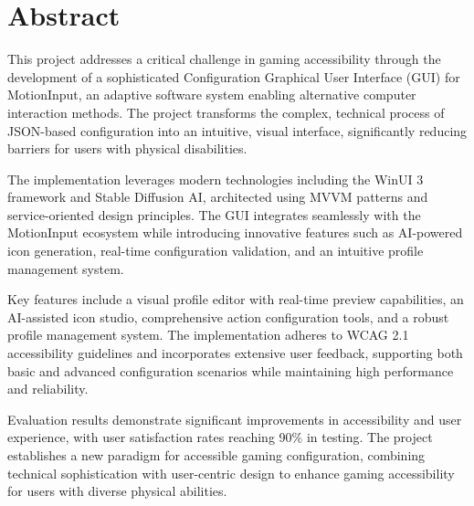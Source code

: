 \chapter*{Abstract}

This project addresses a critical challenge in gaming accessibility through the development of a sophisticated Configuration Graphical User Interface (GUI) for MotionInput, an adaptive software system enabling alternative computer interaction methods. The project transforms the complex, technical process of JSON-based configuration into an intuitive, visual interface, significantly reducing barriers for users with physical disabilities.

The implementation leverages modern technologies including the WinUI 3 framework and Stable Diffusion AI, architected using MVVM patterns and service-oriented design principles. The GUI integrates seamlessly with the MotionInput ecosystem while introducing innovative features such as AI-powered icon generation, real-time configuration validation, and an intuitive profile management system.

Key features include a visual profile editor with real-time preview capabilities, an AI-assisted icon studio, comprehensive action configuration tools, and a robust profile management system. The implementation adheres to WCAG 2.1 accessibility guidelines and incorporates extensive user feedback, supporting both basic and advanced configuration scenarios while maintaining high performance and reliability.

Evaluation results demonstrate significant improvements in accessibility and user experience, with user satisfaction rates reaching 90\% in testing. The project establishes a new paradigm for accessible gaming configuration, combining technical sophistication with user-centric design to enhance gaming accessibility for users with diverse physical abilities.

\clearpage
